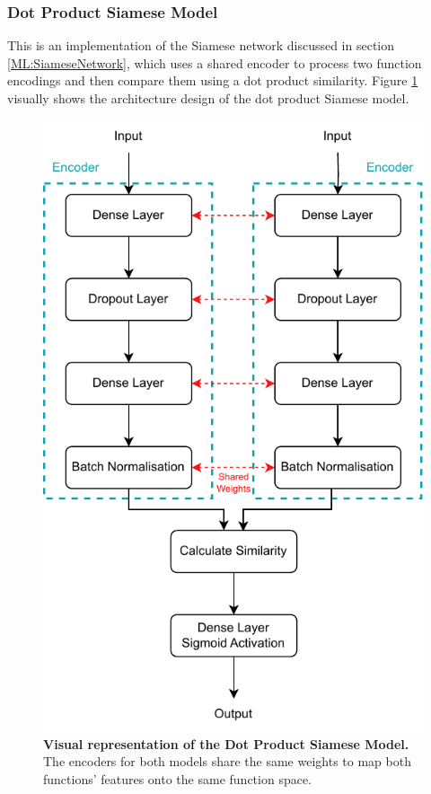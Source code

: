 \subsubsection{Dot Product Siamese Model}
This is an implementation of the Siamese network discussed in section \ref{ML:SiameseNetwork}, which uses a shared encoder to process two function encodings and then compare them using a dot product similarity. Figure \ref{fig:SiameseModelDesign} visually shows the architecture design of the dot product Siamese model.

\begin{figure}[tbh!]
\centering
\includegraphics[scale=1]{Figures/SiameseModel.drawio.pdf}
\caption{\textbf{Visual representation of the Dot Product Siamese Model.} The encoders for both models share the same weights to map both functions' features onto the same function space. }\label{fig:SiameseModelDesign}
\end{figure}

